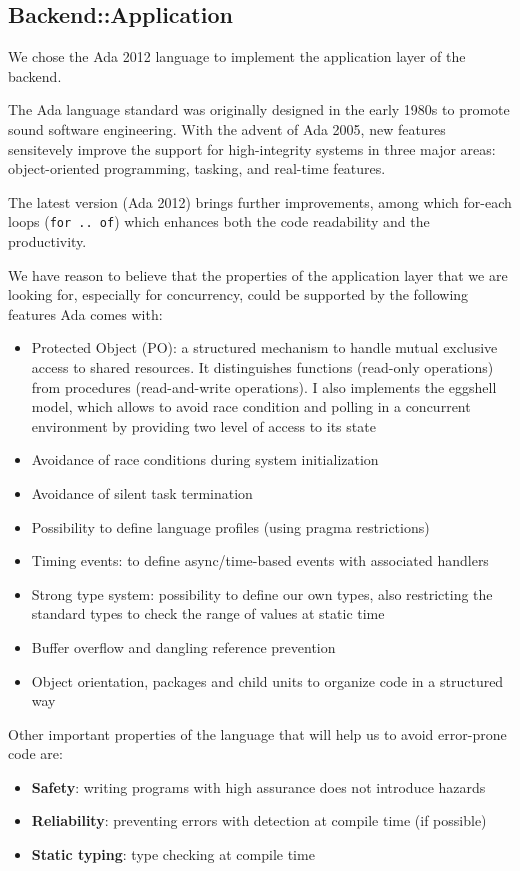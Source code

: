 \subsection{Backend::Application}
We chose the Ada 2012 language to implement the application layer of the
backend.

The Ada language standard was originally designed in the early 1980s to promote
sound software engineering. With the advent of Ada 2005, new features
sensitevely improve the support for high-integrity systems in three major
areas: object-oriented programming, tasking, and real-time features.

The latest version (Ada 2012) brings further improvements, among which for-each
loops (\texttt{for .. of}) which enhances both the code readability and the
productivity.

We have reason to believe that the properties of the application layer
that we are looking for, especially for concurrency, could be supported by the
following features Ada comes with:
\begin{itemize}
  \item Protected Object (PO): a structured mechanism to handle
        mutual exclusive access to shared resources.
        It distinguishes functions (read-only
        operations) from procedures (read-and-write operations). I also
        implements the eggshell model, which allows to avoid race condition and
        polling in a concurrent environment by providing two level of access
        to its state
  \item Avoidance of race conditions during system initialization
  \item Avoidance of silent task termination
  \item Possibility to define language profiles (using pragma restrictions)
  \item Timing events: to define async/time-based events with associated
        handlers
  \item Strong type system: possibility to define our own types, also restricting
  the standard types to check the range of values at static time
  \item Buffer overflow and dangling reference prevention
  \item Object orientation, packages and child units to organize code in a
  structured way
\end{itemize}

Other important properties of the language that will help us to avoid
error-prone code are:
\begin{itemize}
  \item \textbf{Safety}: writing programs with high assurance does not
        introduce hazards
  \item \textbf{Reliability}: preventing errors with detection at compile time
        (if possible)
  \item \textbf{Static typing}: type checking at compile time
\end{itemize}

